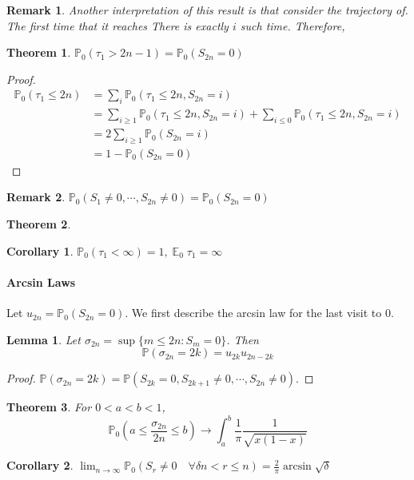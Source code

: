 \documentclass{article}
\newtheorem{Thm}{Theorem}[section]
\newtheorem{Cor}{Corollary}[Thm]
\newtheorem{Lem}{Lemma}[section]
\newtheorem*{Rk}{Remark}
\theoremstyle{definition}
\newcommand{\EE}{\operatorname{\mathbb{E}}}
\newcommand{\PP}{\mathbb{P}}
\renewcommand{\leq}{\leqslant}
\renewcommand{\geq}{\geqslant}
\newcommand{\<}{\left\langle}
\renewcommand{\>}{\right\rangle}
\begin{document}
\begin{Rk}
    Another interpretation of this result is that consider the trajectory of.
    The first time that it reaches 
    There is exactly $i$ such time. Therefore, 
\end{Rk}
\begin{Thm}
    $\PP_0(\tau_1>2n-1)=\PP_0(S_{2n}=0)$
\end{Thm}
\begin{proof}
    \begin{align*}
        \PP_0(\tau_1\leq 2n)&=\sum_i \PP_0(\tau_1\leq 2n,S_{2n}=i)\\
        &=\sum_{i\geq 1} \PP_0(\tau_1\leq 2n,S_{2n}=i)+\sum_{i\leq 0} \PP_0(\tau_1\leq 2n,S_{2n}=i)\\
        &=2\sum_{i\geq 1} \PP_0(S_{2n}=i)\\
        &=1-\PP_0(S_{2n}=0)
    \end{align*}
\end{proof}
\begin{Rk}
    $\PP_0(S_1\neq 0,\cdots,S_{2n}\neq 0)=\PP_0(S_{2n}=0)$
\end{Rk}

\begin{Thm}
    
\end{Thm}

\begin{Cor}
    $\PP_0(\tau_1<\infty)=1,\EE_0\tau_1=\infty$
\end{Cor}

\paragraph{Arcsin Laws}
Let $u_{2n}=\PP_0(S_{2n}=0)$. We first describe the arcsin law for the last visit to $0$.
\begin{Lem}
    Let $\sigma_{2n}=\sup\{m\leq 2n:S_m=0\} $. Then 
    \[\PP(\sigma_{2n}=2k)=u_{2k}u_{2n-2k} \] 
\end{Lem}
\begin{proof}
    $\PP(\sigma_{2n}=2k)=\PP(S_{2k}=0,S_{2k+1}\neq 0,\cdots,S_{2n}\neq 0)$.
\end{proof}

\begin{Thm}
    For $0<a<b<1$,
    \[ \PP_0(a\leq \frac{\sigma_{2n}}{2n}\leq b)\to \int_{a}^{b}\frac{1}{\pi}\frac{1}{\sqrt{x(1-x)}}\]
\end{Thm}
\begin{Cor}
    $\lim_{n\to\infty}\PP_0(S_r\neq 0 \quad\forall \delta n<r\leq n)=\frac{2}{\pi}\arcsin \sqrt{\delta}$
\end{Cor}
\end{document}
